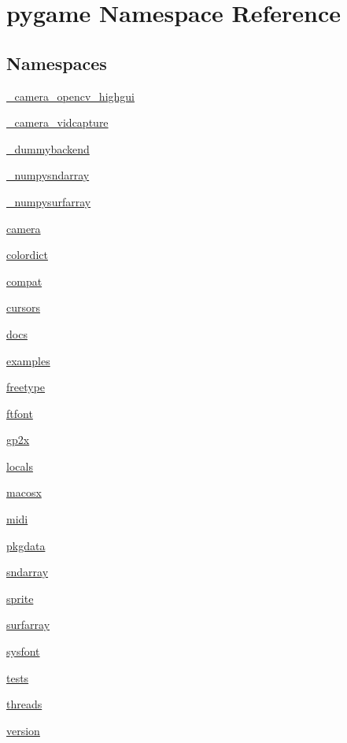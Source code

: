 \hypertarget{namespacepygame}{}\section{pygame Namespace Reference}
\label{namespacepygame}
\subsection*{Namespaces}
\begin{DoxyCompactItemize}
\item 
 \hyperlink{namespacepygame_1_1__camera__opencv__highgui}{\+\_\+camera\+\_\+opencv\+\_\+highgui}
\item 
 \hyperlink{namespacepygame_1_1__camera__vidcapture}{\+\_\+camera\+\_\+vidcapture}
\item 
 \hyperlink{namespacepygame_1_1__dummybackend}{\+\_\+dummybackend}
\item 
 \hyperlink{namespacepygame_1_1__numpysndarray}{\+\_\+numpysndarray}
\item 
 \hyperlink{namespacepygame_1_1__numpysurfarray}{\+\_\+numpysurfarray}
\item 
 \hyperlink{namespacepygame_1_1camera}{camera}
\item 
 \hyperlink{namespacepygame_1_1colordict}{colordict}
\item 
 \hyperlink{namespacepygame_1_1compat}{compat}
\item 
 \hyperlink{namespacepygame_1_1cursors}{cursors}
\item 
 \hyperlink{namespacepygame_1_1docs}{docs}
\item 
 \hyperlink{namespacepygame_1_1examples}{examples}
\item 
 \hyperlink{namespacepygame_1_1freetype}{freetype}
\item 
 \hyperlink{namespacepygame_1_1ftfont}{ftfont}
\item 
 \hyperlink{namespacepygame_1_1gp2x}{gp2x}
\item 
 \hyperlink{namespacepygame_1_1locals}{locals}
\item 
 \hyperlink{namespacepygame_1_1macosx}{macosx}
\item 
 \hyperlink{namespacepygame_1_1midi}{midi}
\item 
 \hyperlink{namespacepygame_1_1pkgdata}{pkgdata}
\item 
 \hyperlink{namespacepygame_1_1sndarray}{sndarray}
\item 
 \hyperlink{namespacepygame_1_1sprite}{sprite}
\item 
 \hyperlink{namespacepygame_1_1surfarray}{surfarray}
\item 
 \hyperlink{namespacepygame_1_1sysfont}{sysfont}
\item 
 \hyperlink{namespacepygame_1_1tests}{tests}
\item 
 \hyperlink{namespacepygame_1_1threads}{threads}
\item 
 \hyperlink{namespacepygame_1_1version}{version}
\end{DoxyCompactItemize}

